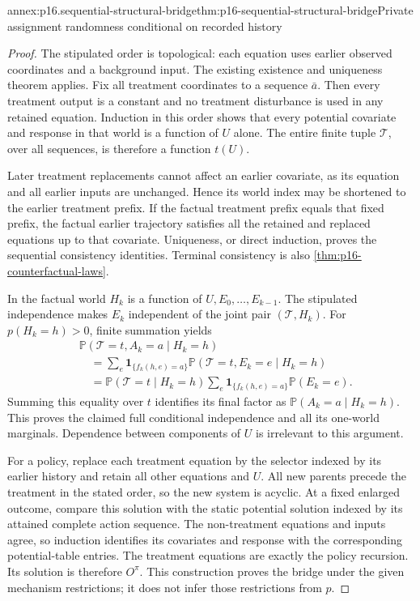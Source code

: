 \begin{annexitem}{annex:p16.sequential-structural-bridge}{thm:p16-sequential-structural-bridge}{Private assignment randomness conditional on recorded history}
\begin{proof}
The stipulated order is topological: each equation uses earlier observed
coordinates and a background input. The existing existence and uniqueness
theorem applies. Fix all treatment coordinates to a sequence \(\bar a\).
Then every treatment output is a constant and no treatment disturbance
is used in any retained equation. Induction in this order shows that every
potential covariate and response in that world is a function of \(U\)
alone. The entire finite tuple \(\mathcal T\), over all sequences, is
therefore a function \(t(U)\).

Later treatment replacements cannot affect an earlier covariate, as its
equation and all earlier inputs are unchanged. Hence its world index may
be shortened to the earlier treatment prefix. If the factual treatment
prefix equals that fixed prefix, the factual earlier trajectory satisfies
all the retained and replaced equations up to that covariate. Uniqueness,
or direct induction, proves the sequential consistency identities. Terminal
consistency is also \cref{thm:p16-counterfactual-laws}.

In the factual world \(H_k\) is a function of \(U,E_0,\ldots,E_{k-1}\).
The stipulated independence makes \(E_k\) independent of the joint pair
\((\mathcal T,H_k)\). For \(p(H_k=h)>0\), finite summation yields
\[
\begin{aligned}
 &\mathbb P(\mathcal T=t,A_k=a\mid H_k=h)\\
 &\quad=\sum_e\mathbf1_{\{f_k(h,e)=a\}}
       \mathbb P(\mathcal T=t,E_k=e\mid H_k=h)\\
 &\quad=\mathbb P(\mathcal T=t\mid H_k=h)
       \sum_e\mathbf1_{\{f_k(h,e)=a\}}\mathbb P(E_k=e).
\end{aligned}
\]
Summing this equality over \(t\) identifies its final factor as
\(\mathbb P(A_k=a\mid H_k=h)\). This proves the claimed full conditional
independence and all its one-world marginals. Dependence between components
of \(U\) is irrelevant to this argument.

For a policy, replace each treatment equation by the selector indexed by
its earlier history and retain all other equations and \(U\). All new
parents precede the treatment in the stated order, so the new system is
acyclic. At a fixed enlarged outcome, compare this solution with the static
potential solution indexed by its attained complete action sequence. The
non-treatment equations and inputs agree, so induction identifies its
covariates and response with the corresponding potential-table entries.
The treatment equations are exactly the policy recursion. Its solution is
therefore \(O^\pi\). This construction proves the bridge under the given
mechanism restrictions; it does not infer those restrictions from \(p\).
\end{proof}
\end{annexitem}

